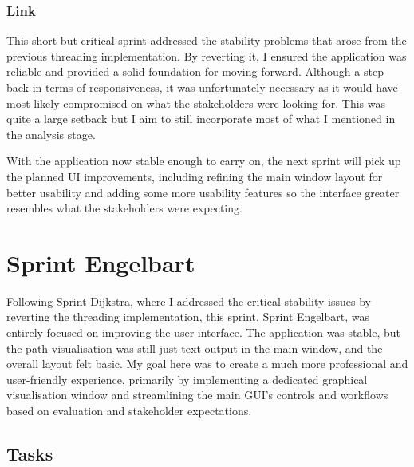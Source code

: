 \subsubsection{Link}
This short but critical sprint addressed the stability problems that arose from the previous threading implementation. By reverting it, I ensured the application was reliable and provided a solid foundation for moving forward. Although a step back in terms of responsiveness, it was unfortunately necessary as it would have most likely compromised on what the stakeholders were looking for. This was quite a large setback but I aim to still incorporate most of what I mentioned in the analysis stage.

With the application now stable enough to carry on, the next sprint will pick up the planned UI improvements, including refining the main window layout for better usability and adding some more usability features so the interface greater resembles what the stakeholders were expecting.

\newpage

\section{Sprint Engelbart}

Following Sprint Dijkstra, where I addressed the critical stability issues by reverting the threading implementation, this sprint, Sprint Engelbart, was entirely focused on improving the user interface. The application was stable, but the path visualisation was still just text output in the main window, and the overall layout felt basic. My goal here was to create a much more professional and user-friendly experience, primarily by implementing a dedicated graphical visualisation window and streamlining the main GUI's controls and workflows based on evaluation and stakeholder expectations.

\subsection{Tasks}

